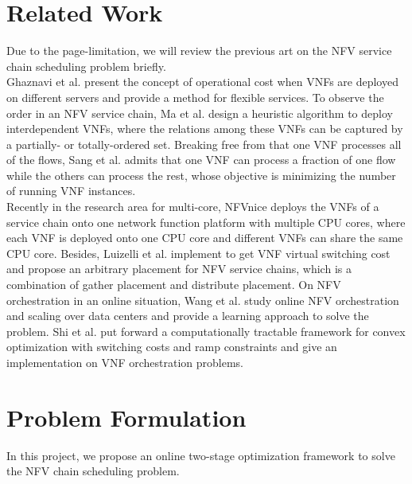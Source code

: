 \documentclass{acmtog}
\begin{document}
\section{Related Work}
\indent Due to the page-limitation, we will review the previous art on the NFV service chain scheduling problem briefly.
\\ Ghaznavi et al. \cite{c4} present the concept of operational cost when VNFs are deployed on different servers and provide a method for flexible services. To observe the order in an NFV
service chain, Ma et al. \cite{c5} design a heuristic algorithm to deploy interdependent VNFs, where the relations among these VNFs can be captured by a partially- or totally-ordered set. Breaking free from that one VNF processes all of the flows, Sang et al. \cite{c6} admits that one VNF can process a fraction of one flow while the others can process the rest, whose objective is minimizing the number of running VNF instances. 
\\\indent Recently in the research area for multi-core, NFVnice \cite{c7}  deploys the VNFs of a service chain onto one network function platform with multiple CPU cores, where each VNF is deployed onto one CPU core and different VNFs can share the same CPU core. Besides, Luizelli et al. \cite{c1}\cite{c2} implement to get VNF virtual switching cost and propose an arbitrary placement for NFV service chains, which is a combination of gather placement and distribute placement. On NFV orchestration in an online situation, Wang et al. \cite{c8} study online NFV orchestration and scaling over data centers and provide a learning approach to solve the problem. Shi et al. \cite{c3} put forward a computationally tractable framework for convex optimization with switching costs and ramp constraints and give an implementation on VNF orchestration problems.


\section{Problem Formulation}
In this project, we propose an online two-stage optimization framework to solve the NFV chain scheduling problem.
\end{document}
